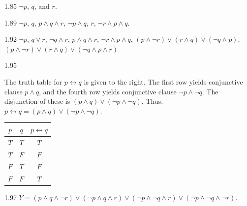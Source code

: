 \begin{Answer}{1.85}
$\neg p$, $q$, and $r$.
\end{Answer}
\begin{Answer}{1.89}
$\neg p$,
$q$,
$p\wedge q \wedge r$,
$\neg p \wedge q$,
$r$,
$\neg r \wedge p \wedge q$.
\end{Answer}
\begin{Answer}{1.92}
$\neg p$,
$q\vee r$,
$\neg q\wedge r$,
$p\wedge q \wedge r$,
$\neg r \wedge p \wedge q$,
$(p\wedge \neg r)\vee(r\wedge q) \vee (\neg q\wedge p)$,
$(p\wedge \neg r)\vee(r\wedge q) \vee (\neg q\wedge p\wedge r)$
\end{Answer}
\begin{Answer}{1.95}
\begin{minipage}[t]{4in}
The truth table for $p\leftrightarrow q$ is given to the right.
The first row yields conjunctive clause $p\wedge q$, and the fourth row
yields conjunctive clause $\neg p\wedge \neg q$.  The disjunction of these is
$(p\wedge q)\vee(\neg p\wedge \neg q)$.
Thus, $p\leftrightarrow q = (p\wedge q)\vee(\neg p\wedge \neg q)$.
\end{minipage}
\hfill
\begin{minipage}[t]{1.5in}
\begin{tabular}[t]{|cc||c|}
\hline
$p$ & $q$ &$p\leftrightarrow q$\\
\hline
$T$ & $T$& $T$ \\
$T$ & $F$& $F$ \\
$F$ & $T$& $F$ \\
$F$ & $F$& $T$ \\
\hline
\end{tabular}
\end{minipage}
\end{Answer}
\begin{Answer}{1.97}
$Y=
(p\wedge q \wedge \neg r) \vee
(\neg p\wedge q \wedge r) \vee
(\neg p\wedge \neg q \wedge r) \vee
(\neg p\wedge \neg q \wedge \neg r)$.
\end{Answer}

